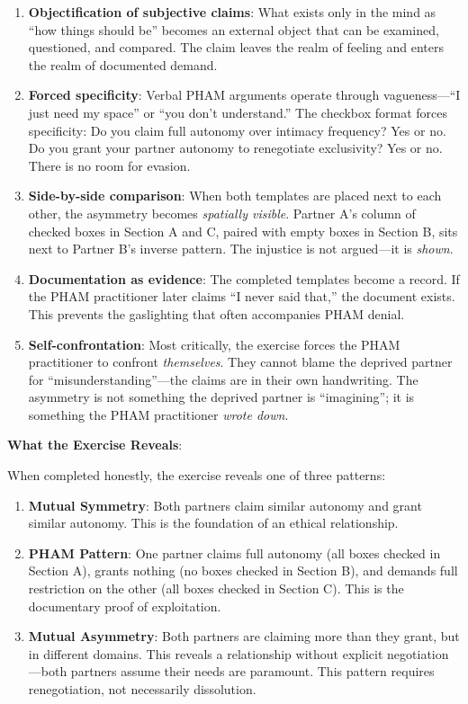 \documentclass[12pt, letterpaper]{article}
\begin{document}
\begin{enumerate}
    \item \textbf{Objectification of subjective claims}: What exists only in the mind as ``how things should be'' becomes an external object that can be examined, questioned, and compared. The claim leaves the realm of feeling and enters the realm of documented demand.
    
    \item \textbf{Forced specificity}: Verbal PHAM arguments operate through vagueness---``I just need my space'' or ``you don't understand.'' The checkbox format forces specificity: Do you claim full autonomy over intimacy frequency? Yes or no. Do you grant your partner autonomy to renegotiate exclusivity? Yes or no. There is no room for evasion.
    
    \item \textbf{Side-by-side comparison}: When both templates are placed next to each other, the asymmetry becomes \textit{spatially visible}. Partner A's column of checked boxes in Section A and C, paired with empty boxes in Section B, sits next to Partner B's inverse pattern. The injustice is not argued---it is \textit{shown}.
    
    \item \textbf{Documentation as evidence}: The completed templates become a record. If the PHAM practitioner later claims ``I never said that,'' the document exists. This prevents the gaslighting that often accompanies PHAM denial.
    
    \item \textbf{Self-confrontation}: Most critically, the exercise forces the PHAM practitioner to confront \textit{themselves}. They cannot blame the deprived partner for ``misunderstanding''---the claims are in their own handwriting. The asymmetry is not something the deprived partner is ``imagining''; it is something the PHAM practitioner \textit{wrote down}.
\end{enumerate}

\textbf{What the Exercise Reveals}:

When completed honestly, the exercise reveals one of three patterns:

\begin{enumerate}
    \item \textbf{Mutual Symmetry}: Both partners claim similar autonomy and grant similar autonomy. This is the foundation of an ethical relationship.
    
    \item \textbf{PHAM Pattern}: One partner claims full autonomy (all boxes checked in Section A), grants nothing (no boxes checked in Section B), and demands full restriction on the other (all boxes checked in Section C). This is the documentary proof of exploitation.
    
    \item \textbf{Mutual Asymmetry}: Both partners are claiming more than they grant, but in different domains. This reveals a relationship without explicit negotiation---both partners assume their needs are paramount. This pattern requires renegotiation, not necessarily dissolution.
\end{enumerate}
\end{document}

